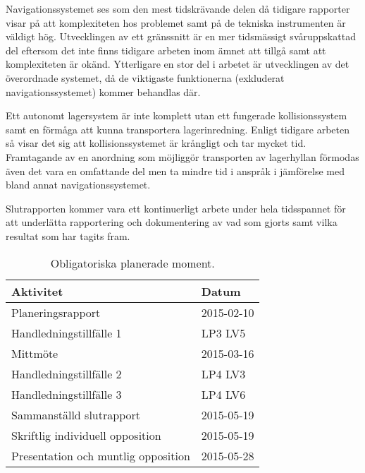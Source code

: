 \documentclass[a4paper,11pt]{article}
\begin{document}
Navigationssystemet ses som den mest tidskrävande delen då tidigare
rapporter visar på att komplexiteten hos problemet samt på de tekniska
instrumenten är väldigt hög. Utvecklingen av ett gränssnitt är en mer
tidsmässigt svåruppskattad del eftersom det inte finns tidigare arbeten
inom ämnet att tillgå samt att komplexiteten är okänd. Ytterligare en stor
del i arbetet är utvecklingen av det överordnade systemet, då de viktigaste
funktionerna (exkluderat navigationssystemet) kommer behandlas där. 

Ett autonomt lagersystem är inte komplett utan ett fungerade
kollisionssystem samt en förmåga att kunna transportera lagerinredning.
Enligt tidigare arbeten så visar det sig att kollisionssystemet är
krångligt och tar mycket tid\cite{laser,qr}. Framtagande av en anordning
som möjliggör transporten av lagerhyllan förmodas även det vara en
omfattande del men ta mindre tid i anspråk i jämförelse med bland annat
navigationssystemet.

Slutrapporten kommer vara ett kontinuerligt arbete under hela tidsspannet
för att underlätta rapportering och dokumentering av vad som gjorts samt
vilka resultat som har tagits fram.



\begin{table}[h]
  \begin{center}
    \begin{tabular}{l | l}
      Aktivitet                           & Datum      \\ \hline
      Planeringsrapport                   & 2015-02-10 \\
      Handledningstillfälle 1             & LP3 LV5    \\
      Mittmöte                            & 2015-03-16 \\
      Handledningstillfälle 2             & LP4 LV3    \\
      Handledningstillfälle 3             & LP4 LV6    \\
      Sammanställd slutrapport            & 2015-05-19 \\
      Skriftlig individuell opposition    & 2015-05-19 \\
      Presentation och muntlig opposition & 2015-05-28 \\
    \end{tabular}
  \end{center}
  \caption{Obligatoriska planerade moment.}
  \label{tab:planeringstabell}
\end{table}
\end{document}
